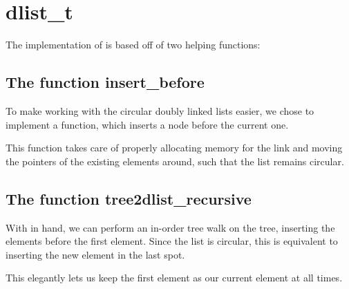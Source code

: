 \section{dlist\_t}

The implementation of  is based off of two helping functions:

\subsection{The function insert\_before}
To make working with the circular doubly linked lists easier, we chose to
implement a function, which inserts a node before the current one.

This function takes care of properly allocating memory for the link and
moving the pointers of the existing elements around, such that the list
remains circular.

\subsection{The function tree2dlist\_recursive}
With  in hand, we can perform an in-order tree walk
on the tree, inserting the elements before the first element. Since the list
is circular, this is equivalent to inserting the new element in the last spot.

This elegantly lets us keep the first element as our current element at all
times.
